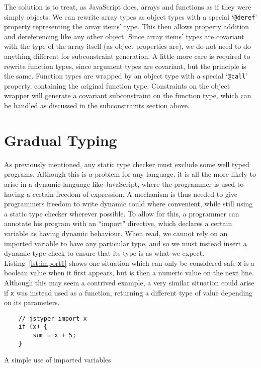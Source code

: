 \documentclass[12pt,a4paper,twoside,openright]{report}
\newcommand*{\js}{\texttt}
\begin{document}
The solution is to treat, as JavaScript does, arrays and functions as if they
were simply objects. We can rewrite array types as object types with a special
`\texttt{@deref}' property representing the array items' type. This then allows
property addition and dereferencing like any other object. Since array items'
types are covariant with the type of the array itself (as object properties
are), we do not need to do anything different for subconstraint generation. A
little more care is required to rewrite function types, since argument types
are covariant, but the principle is the same. Function types are wrapped by an
object type with a special `\texttt{@call}' property, containing the original
function type. Constraints on the object wrapper will generate a covariant
subconstraint on the function type, which can be handled as discussed in the
subconstraints section above.

\section{Gradual Typing}

As previously mentioned, any static type checker must exclude some well typed
programs.  Although this is a problem for any language, it is all the more
likely to arise in a dynamic language like JavaScript, where the programmer is
used to having a certain freedom of expression. A mechanism is thus needed to
give programmers freedom to write dynamic could where convenient, while still
using a static type checker wherever possible. To allow for this, a programmer
can annotate his program with an ``import" directive, which declares a certain
variable as having dynamic behaviour. When read, we cannot rely on an imported
variable to have any particular type, and so we must instead insert a dynamic
type-check to ensure that its type is as what we expect.
Listing~\ref{lst:import1} shows one situation which can only be considered safe
\js{x} is a boolean value when it first appears, but is then a numeric value on
the next line. Although this may seem a contrived example, a very similar
situation could arise if \js{x} was instead used as a function, returning a
different type of value depending on its parameters.
\begin{program}
  \begin{verbatim}
	// jstyper import x
	if (x) {
		sum = x + 5;
	}
  \end{verbatim}
  \caption{A simple use of imported variables}\label{lst:import1}
\end{program}
\end{document}
